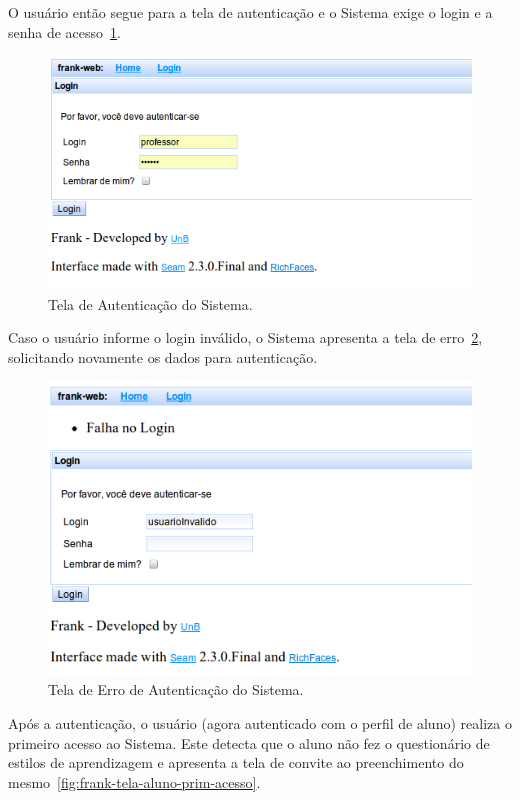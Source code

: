 O usuário então segue para a tela de autenticação e o Sistema exige o login e a senha de acesso~\ref{fig:frank-tela-aluno-login}. 

\begin{figure}
	\centering
	\includegraphics[scale=0.6]{images/frank-tela-aluno-login.png}
	\caption{Tela de Autenticação do Sistema.}
	\label{fig:frank-tela-aluno-login}
\end{figure}

Caso o usuário informe o login inválido, o Sistema apresenta a tela de erro~\ref{fig:frank-tela-login-invalido}, solicitando novamente os dados para autenticação.

\begin{figure}
	\centering
	\includegraphics[scale=0.6]{images/frank-tela-login-invalido.png}
	\caption{Tela de Erro de Autenticação do Sistema.}
	\label{fig:frank-tela-login-invalido}
\end{figure}

Após a autenticação, o usuário (agora autenticado com o perfil de aluno) realiza o primeiro acesso ao Sistema. Este detecta que o aluno não fez o questionário de estilos de aprendizagem e apresenta a tela de convite ao preenchimento do mesmo~\ref{fig:frank-tela-aluno-prim-acesso}.


